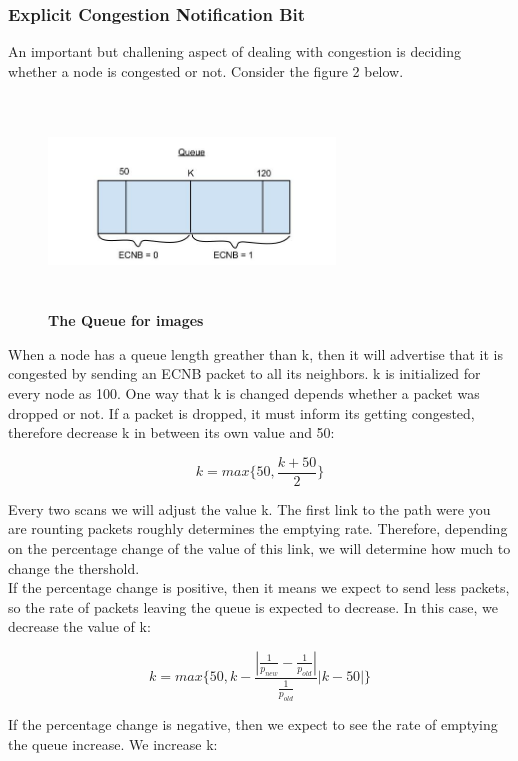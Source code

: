 \documentclass[letterpaper]{article}
\begin{document}
\subsubsection{Explicit Congestion Notification Bit}

An important but challening aspect of dealing with congestion is deciding whether a node is congested or not.
Consider the figure 2 below.
\\
 
\begin{figure}[ht!]
\centering
\includegraphics[width=3in, height=2.2in]{Queue4.jpg}
\caption{\textbf{The Queue for images}}
\end{figure}

\noindent When a node has a queue length greather than k, then it will advertise that it is congested by sending an ECNB packet to all its neighbors. k is initialized for every node as 100. One way that k is changed depends 
whether a packet was dropped or not. If a packet is
dropped, it must inform its getting congested, therefore decrease k 
in between its own value and 50:


$$ k = max\{50, \frac{k + 50}{2} \}$$

\noindent Every two scans we will adjust the value k. The first link to the path were you are rounting packets
roughly determines the emptying rate. Therefore, depending on the percentage change of the value of this link, we will determine how much to change the thershold.
\\

\noindent If the percentage change is positive, then it means we expect to send less packets, so the rate of packets
leaving the queue is expected to decrease. In this case, we decrease the value of k:

$$ k = max\{50, k -  \frac{|\frac{1}{p_{new}} - \frac{1}{p_{old}}|}{\frac{1}{p_{old}}}|k - 50|   \}$$ 

\noindent If the percentage change is negative, then we expect to see the rate of emptying the queue increase. We increase k:
\end{document}
